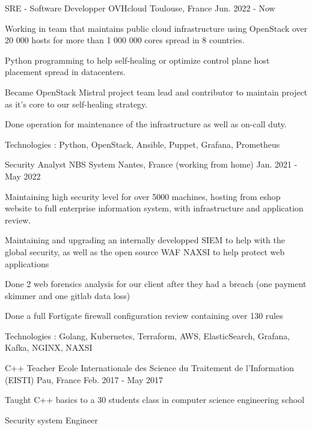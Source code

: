 \begin{cventries}
  \cventry
  {SRE - Software Developper}
  {OVHcloud}
  {Toulouse, France}
  {Jun. 2022 - Now}
  {
  \begin{cvitems}
  	\item {Working in team that maintains public cloud infrastructure using OpenStack over 20 000 hosts for more than 1 000 000 cores spread in 8 countries.}
	\item {Python programming to help self-healing or optimize control plane host placement spread in datacenters.}
	\item {Became OpenStack Mistral project team lead and contributor to maintain project as it's core to our self-healing strategy.}
	\item {Done operation for maintenance of the infrastructure as well as on-call duty.}
    \item {Technologies : Python, OpenStack, Ansible, Puppet, Grafana, Prometheus}
  \end{cvitems}
  }
  \cventry
  {Security Analyst}
  {NBS System}
  {Nantes, France (working from home)}
  {Jan. 2021 - May 2022}
  {
  \begin{cvitems}
    \item {Maintaining high security level for over 5000 machines, hosting from eshop website to full enterprise information system, with infrastructure and application review.}
    \item {Maintaining and upgrading an internally developped SIEM to help with the global security, as well as the open source WAF NAXSI to help protect web applications}
    \item {Done 2 web forensics analysis for our client after they had a breach (one payment skimmer and one gitlab data loss)}
    \item {Done a full Fortigate firewall configuration review containing over 130 rules}
    \item {Technologies : Golang, Kubernetes, Terraform, AWS, ElasticSearch, Grafana, Kafka, NGINX, NAXSI}
  \end{cvitems}
  }
  \cventry
  {C++ Teacher}
  {Ecole Internationale des Science du Traitement de l'Information (EISTI)}
  {Pau, France}
  {Feb. 2017 - May 2017}
  {
  \begin{cvitems}
    \item {Taught C++ basics to a 30 students class in computer science engineering school}
  \end{cvitems}
  }
  \cventry
  {Security system Engineer}

\end{cventries}
